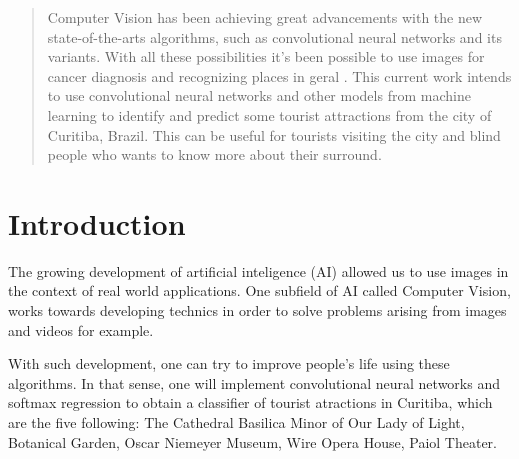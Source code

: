 \documentclass{article}
\begin{document}

\begin{abstract}
    Computer Vision has been achieving great advancements with the new
    state-of-the-arts algorithms, such as convolutional neural networks
    and its variants. With all these possibilities it's been possible
    to use images for cancer diagnosis \cite{Litjens} and recognizing
    places in geral \cite{places}. This current work intends to use convolutional
    neural networks and other models from machine learning to identify and predict
    some tourist attractions from the city of Curitiba, Brazil.
    This can be useful for tourists visiting the city and blind people who wants
    to know more about their surround.
\end{abstract}


\section{Introduction}

    The growing development of artificial inteligence (AI) allowed us to use images in the
    context of real world applications. One subfield of AI called Computer Vision, works
    towards developing technics in order to solve problems arising from images and videos
    for example.

    With such development, one can try to improve people's life using these algorithms.
    In that sense, one will implement convolutional neural networks and softmax
    regression to obtain a classifier of tourist atractions in Curitiba, which are
    the five following: The Cathedral Basilica Minor
    of Our Lady of Light, Botanical Garden, Oscar Niemeyer Museum, Wire Opera House,
    Paiol Theater.
\end{document}
